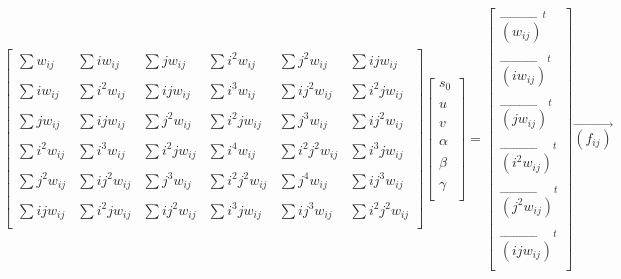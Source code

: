 \documentclass[aps,onecolumn]{revtex4}
\begin{document}
\begin{equation}
\begin{bmatrix}
\sum w_{ij} & \sum iw_{ij} & \sum jw_{ij} & \sum i^2w_{ij} & \sum j^2w_{ij} & \sum ijw_{ij} \\
\\
\sum iw_{ij} & \sum i^2w_{ij} & \sum ijw_{ij} & \sum i^3w_{ij} & \sum ij^2w_{ij} & \sum i^2jw_{ij} \\
\\
\sum jw_{ij} & \sum ijw_{ij} & \sum j^2 w_{ij} & \sum i^2 j w_{ij} & \sum j^3 w_{ij} & \sum ij^2 w_{ij} \\
\\
\sum i^2w_{ij} & \sum i^3w_{ij} & \sum i^2jw_{ij} & \sum i^4w_{ij} & \sum i^2j^2w_{ij} & \sum i^3jw_{ij} \\
\\
\sum j^2w_{ij} & \sum ij^2 w_{ij} & \sum j^3 w_{ij} & \sum i^2j^2 w_{ij} & \sum j^4 w_{ij} & \sum ij^3 w_{ij} \\
\\
\sum ij w_{ij} & \sum i^2j w_{ij} & \sum ij^2 w_{ij} & \sum i^3j w_{ij} & \sum ij^3w_{ij} & \sum i^2j^2w_{ij} \\
\end{bmatrix}
\begin{bmatrix}
s_0\\
\\
u\\
\\
v\\
\\
\alpha\\
\\
\beta\\
\\
\gamma\\
\end{bmatrix}
=
\begin{bmatrix}
\overrightarrow{(w_{ij})}^t\\
\\
\overrightarrow{(iw_{ij})}^t\\
\\
\overrightarrow{(jw_{ij})}^t\\
\\
\overrightarrow{(i^2w_{ij})}^t\\
\\
\overrightarrow{(j^2w_{ij})}^t\\
\\
\overrightarrow{(ijw_{ij})}^t\\
\end{bmatrix}
\overrightarrow{(f_{ij})}
\end{equation}
\end{document}
